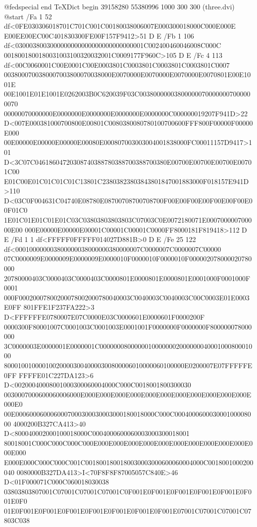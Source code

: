 @fedspecial end TeXDict begin
39158280 55380996 1000 300 300 (three.dvi) @start
/Fa 1 52 df<0FE030306018701C701C001C00180038006007E000300018000C000E000E
E00EE00EC00C401830300FE00F157F9412>51 D E
/Fb 1 106 df<0300038003000000000000000000000000001C002400460046008C000C
0018001800180031003100320032001C0009177F960C>105 D E
/Fc 4 113 df<00C0060001C00E0001C00E0003801C0003801C0003801C0003801C0007
0038000700380007003800070038000E0070000E0070000E0070000E0070801E00E1001E
00E1001E01E1001E0262003B0C620039F03C003800000038000000700000007000000070
00000070000000E0000000E0000000E0000000E0000000C000000019207F941D>22
D<007E000381000700800E00801C0080380080780100700600FFF800F00000F00000E000
00E00000E00000E00000E00080E000807003003004001838000FC00011157D9417>101
D<3C07C04618604720308740388780388700388700380E00700E00700E00700E00701C00
E01C00E01C01C01C01C13801C23803823803843801847001883000F018157E941D>110
D<03C0F004631C04740E08780E08700708700708700F00E00F00E00F00E00F00E00F01C0
1E01C01E01C01E01C03C03803803803803C07003C0E0072180071E000700000700000E00
000E00000E00000E00001C00001C00001C0000FF8000181F819418>112
D E
/Fd 1 1 df<FFFFF0FFFFF014027D881B>0 D E
/Fe 25 122 df<000100000003800000038000000380000007C0000007C0000007C00000
07C0000009E0000009E0000009E0000010F0000010F0000010F000002078000020780000
20780000403C0000403C0000403C0000801E0000801E0000801E0001000F0001000F0001
000F00020007800200078002000780040003C0040003C0040003C00C0003E01E0003E0FF
801FFE1F237FA222>3 D<FFFFFFE0780007E07C0000E03C0000601E0000601F0000200F
0000300F80001007C0001003C0001003E0001001F0000000F0000000F800000078000000
3C0000003E0000001E0000001C0000000800000010000000200000004000100080001000
8000100100001002000030040000300800006010000060100000E0200007E07FFFFFE0FF
FFFFE01C227DA123>6 D<00200040008001000300060004000C000C0018001800300030
0030007000600060006000E000E000E000E000E000E000E000E000E000E000E000E000E0
00E0006000600060007000300030003000180018000C000C000400060003000100008000
4000200B327CA413>40 D<800040002000100018000C0004000600060003000300018001
80018001C000C000C000C000E000E000E000E000E000E000E000E000E000E000E000E000
E000E000C000C000C001C0018001800180030003000600060004000C0018001000200040
0080000B327DA413>I<70F8F8F87005057C840E>46 D<01F000071C000C060018030038
03803803807001C07001C07001C07001C0F001E0F001E0F001E0F001E0F001E0F001E0F0
01E0F001E0F001E0F001E0F001E0F001E0F001E0F001E07001C07001C07001C07803C038
